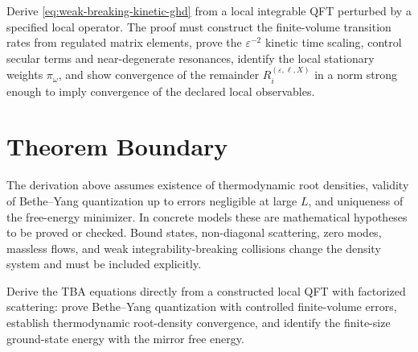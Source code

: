 \begin{openproblem}
\label{op:weak-breaking-kinetic-limit}
Derive \eqref{eq:weak-breaking-kinetic-ghd} from a local integrable QFT
perturbed by a specified local operator.  The proof must construct the
finite-volume transition rates from regulated matrix elements, prove the
\(\varepsilon^{-2}\) kinetic time scaling, control secular terms and
near-degenerate resonances, identify the local stationary weights
\(\pi_\omega\), and show convergence of the remainder
\(R_i^{(\varepsilon,\ell,X)}\) in a norm strong enough to imply convergence
of the declared local observables.
\end{openproblem}

\section{Theorem Boundary}

The derivation above assumes existence of thermodynamic root densities,
validity of Bethe--Yang quantization up to errors negligible at large \(L\),
and uniqueness of the free-energy minimizer.  In concrete models these are
mathematical hypotheses to be proved or checked.  Bound states, non-diagonal
scattering, zero modes, massless flows, and weak integrability-breaking
collisions change the density system and must be included explicitly.

\begin{openproblem}
\label{op:tba-from-local-qft}
Derive the TBA equations directly from a constructed local QFT with
factorized scattering: prove Bethe--Yang quantization with controlled
finite-volume errors, establish thermodynamic root-density convergence, and
identify the finite-size ground-state energy with the mirror free energy.
\end{openproblem}
